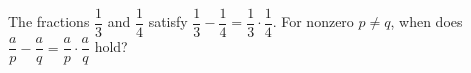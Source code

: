 The fractions $\dfrac13$ and $\dfrac14$ satisfy $\dfrac13-\dfrac14=\dfrac13\cdot\dfrac14$. For nonzero $p\ne q$, when does $\dfrac ap-\dfrac aq=\dfrac ap\cdot\dfrac aq$ hold?
